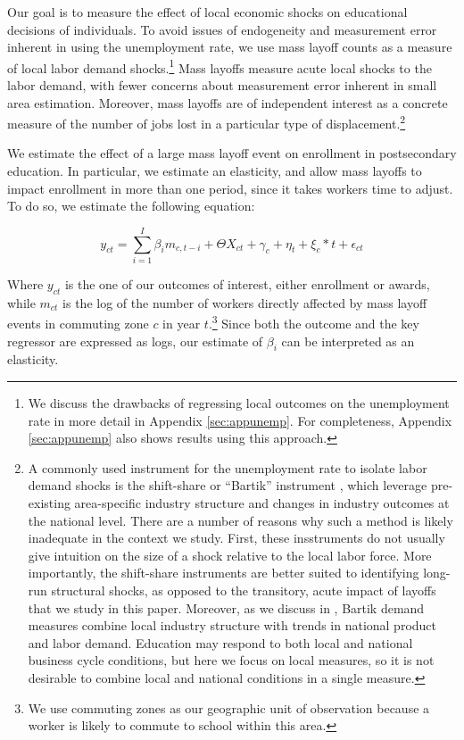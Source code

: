 
Our goal is to measure the effect of local economic shocks on educational decisions of individuals. To avoid issues of endogeneity and measurement error inherent in using the unemployment rate, we use  mass layoff counts as a measure of local labor demand shocks.\footnote{We discuss the drawbacks of regressing local outcomes on the unemployment rate in more detail in Appendix \ref{sec:appunemp}. For completeness,  Appendix \ref{sec:appunemp} also shows results using this approach.}  Mass layoffs measure acute local shocks to the labor demand, with fewer concerns about measurement error inherent in small area estimation. Moreover, mass layoffs are of independent interest as a concrete measure of the number of jobs lost in a particular type of displacement.\footnote{A commonly used instrument for the unemployment rate to isolate labor demand shocks is the shift-share or ``Bartik'' instrument \citep{SW2011, BH2000}, which leverage pre-existing area-specific industry structure and changes in industry outcomes at the national level. There are a number of reasons why such a method is likely inadequate in the context we study. First, these insstruments do not usually give intuition on the  size of a shock relative to the local labor force. More importantly, the shift-share instruments are better suited to identifying long-run structural shocks, as opposed to the transitory, acute impact of layoffs that we study in this paper. Moreover, as we discuss in \citet{FGS2015}, Bartik demand measures combine local industry structure with trends in national product and labor demand. Education may respond to both local and national business cycle conditions, but here we focus on local measures, so it is not desirable to combine local and national conditions  in a single measure. }

We estimate the effect of a large mass layoff event on enrollment in postsecondary education. In particular, we estimate an elasticity, and allow mass layoffs to impact enrollment in more than one period, since it takes workers time to adjust. To do so, we estimate the following equation:

\begin{equation}\label{eqn:main}
y_{ct} = \sum_{i=1}^I \beta_i m_{c,t-i} + \Theta X_{ct} + \gamma_c + \eta_t +\xi_c*t+ \epsilon_{ct}
\end{equation}

Where $y_{ct}$ is the one of our outcomes of interest, either enrollment or awards, while $m_{ct}$ is the log of the number of workers directly affected by mass layoff events in commuting zone $c$ in year $t$.\footnote{We use commuting zones as our geographic unit of observation because a worker is likely to commute to school within this area.} Since both the outcome and the key regressor are expressed as logs, our estimate of $\beta_i$ can be interpreted as an elasticity.

